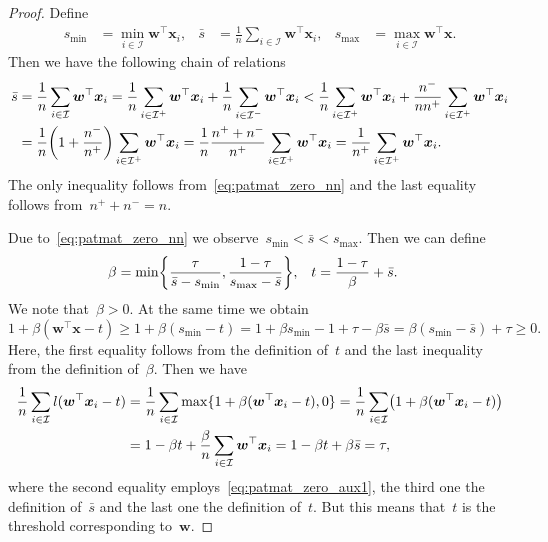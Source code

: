 \documentclass[11pt,a4paper]{article}
\theoremstyle{definition}
\let\originalleft\left
\let\originalright\right
\renewcommand{\left}{\mathopen{}\mathclose\bgroup\originalleft}
\renewcommand{\right}{\aftergroup\egroup\originalright}
\newcommand{\I}{\mathcal{I}}
\begin{document}
\begin{proof}
  Define
  \begin{align*}
    s_{\min} & = \min_{i \in \I} \bm{w}^\top \bm{x}_i,  &
    \bar{s}  & = \frac{1}{n} \sum_{i \in \I} \bm{w}^\top \bm{x}_i, &
    s_{\max} & = \max_{i \in \I} \bm{w}^\top \bm{x}.
  \end{align*}
  Then we have the following chain of relations
  \begin{equation}\label{eq:patmat_zero_aux0}
    \begin{aligned}
    \bar{s} & = \frac{1}{n} \sum_{i \in \I} \bm{w}^\top \bm{x}_i
              = \frac{1}{n} \sum_{i \in \I^+} \bm{w}^\top \bm{x}_i + \frac{1}{n} \sum_{i \in \I^-} \bm{w}^\top \bm{x}_i
              < \frac{1}{n} \sum_{i \in \I^+} \bm{w}^\top \bm{x}_i + \frac{n^-}{nn^+} \sum_{i \in \I^+} \bm{w}^\top \bm{x}_i \\
            & = \frac{1}{n} \left(1 + \frac{n^-}{n^+}\right) \sum_{i \in \I^+} \bm{w}^\top \bm{x}_i
              = \frac{1}{n} \frac{n^+ + n^-}{n^+} \sum_{i \in \I^+} \bm{w}^\top \bm{x}_i
              = \frac{1}{n^+} \sum_{i \in \I^+} \bm{w}^\top \bm{x}_i.
    \end{aligned}
  \end{equation}
  The only inequality follows from~\eqref{eq:patmat_zero_nn} and the last equality follows from~$n^+ + n^- = n.$

  Due to~\eqref{eq:patmat_zero_nn} we observe~$s_{\min}<\bar{s}<s_{\max}.$ Then we can define
  \begin{align*}
    \beta & = \min \left\{\frac{\tau}{\bar{s} - s_{\min}}, \frac{1 - \tau}{s_{\max}-\bar{s}} \right\}, &
    t     & = \frac{1-\tau}{\beta} + \bar{s}.
  \end{align*}
  We note that~$\beta>0.$ At the same time we obtain
  \begin{equation}\label{eq:patmat_zero_aux1}
    1 + \beta(\bm{w}^\top \bm{x} - t) \ge 1 + \beta(s_{\min} - t)
                                      =   1 + \beta s_{\min} - 1 + \tau - \beta \bar{s}
                                      =   \beta (s_{\min}  -\bar{s}) + \tau
                                      \ge 0.
  \end{equation}
  Here, the first equality follows from the definition of~$t$ and the last inequality from the definition of~$\beta.$ Then we have
  \begin{align*}
    \frac{1}{n} \sum_{i \in \I} l(\bm{w}^\top \bm{x}_i - t) & = \frac{1}{n} \sum_{i \in \I} \max\{1 + \beta(\bm{w}^\top \bm{x}_i - t), 0\}
                                                              = \frac{1}{n} \sum_{i \in \I}\left(1 + \beta(\bm{w}^\top \bm{x}_i - t)\right) \\
                                                            & = 1 - \beta t + \frac{\beta}{n}\sum_{i \in \I}\bm{w}^\top \bm{x}_i
                                                              = 1 - \beta t + \beta \bar{s}
                                                              = \tau,
  \end{align*}
  where the second equality employs~\eqref{eq:patmat_zero_aux1}, the third one the definition of~$\bar{s}$ and the last one the definition of~$t.$ But this means that~$t$ is the threshold corresponding to~$\bm{w}.$


\end{proof}
\end{document}
